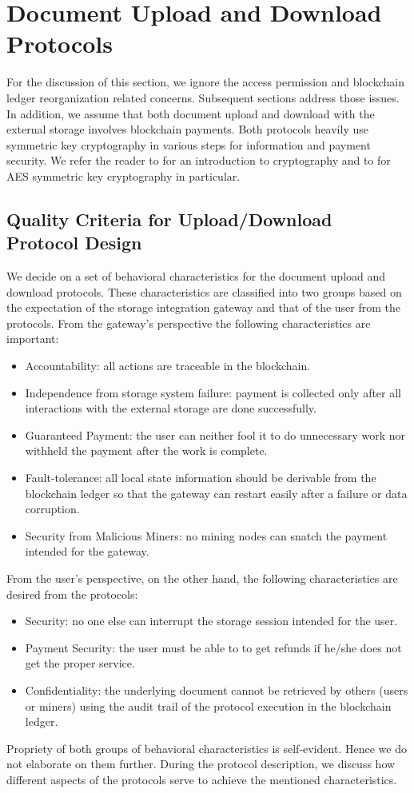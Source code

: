 \section{Document Upload and Download Protocols}
\label{s-updown}
For the discussion of this section, we ignore the access permission and blockchain ledger reorganization related concerns. Subsequent sections address those issues. In addition, we assume that both document upload and download with the external storage involves blockchain payments. Both protocols heavily use symmetric key cryptography in various steps for information and payment security. We refer the reader to \cite{1455525} for an introduction to cryptography and to \cite{Daemen99aesproposal:} for AES symmetric key cryptography in particular.

\subsection{Quality Criteria for Upload/Download Protocol Design}

We decide on a set of behavioral characteristics for the document upload and download protocols. These characteristics are classified into two groups based on the expectation of the storage integration gateway and that of the user from the protocols. 
From the gateway's perspective the following characteristics are important:
\begin{itemize}
\item Accountability: all actions are traceable in the blockchain.
\item Independence from storage system failure: payment is collected only after all interactions with the external storage are done successfully.
\item Guaranteed Payment: the user can neither fool it to do unnecessary work nor withheld the payment after the work is complete.
\item Fault-tolerance: all local state information should be derivable from the blockchain ledger so that the gateway can restart easily after a failure or data corruption.  
\item Security from Malicious Miners: no mining nodes can snatch the payment intended for the gateway. 
\end{itemize}   
From the user's perspective, on the other hand, the following characteristics are desired from the protocols:
\begin{itemize}
\item Security: no one else can interrupt the storage session intended for the user. 
\item Payment Security: the user must be able to to get refunds if he/she does not get the proper service. 
\item Confidentiality: the underlying document cannot be retrieved by others (users or miners) using the audit trail of the protocol execution in the blockchain ledger.
\end{itemize} 
Propriety of both groups of behavioral characteristics is self-evident. Hence we do not elaborate on them further. During the protocol description, we discuss how different aspects of the protocols serve to achieve the mentioned characteristics. 

